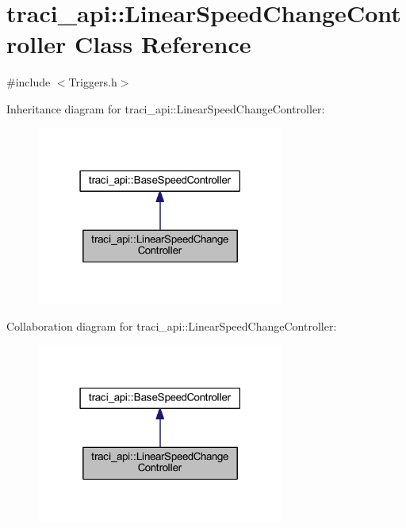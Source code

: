 \hypertarget{classtraci__api_1_1_linear_speed_change_controller}{}\section{traci\+\_\+api\+:\+:Linear\+Speed\+Change\+Controller Class Reference}
\label{classtraci__api_1_1_linear_speed_change_controller}


{\ttfamily \#include $<$Triggers.\+h$>$}



Inheritance diagram for traci\+\_\+api\+:\+:Linear\+Speed\+Change\+Controller\+:\nopagebreak
\begin{figure}[H]
\begin{center}
\leavevmode
\includegraphics[width=231pt]{classtraci__api_1_1_linear_speed_change_controller__inherit__graph}
\end{center}
\end{figure}


Collaboration diagram for traci\+\_\+api\+:\+:Linear\+Speed\+Change\+Controller\+:\nopagebreak
\begin{figure}[H]
\begin{center}
\leavevmode
\includegraphics[width=231pt]{classtraci__api_1_1_linear_speed_change_controller__coll__graph}
\end{center}
\end{figure}
